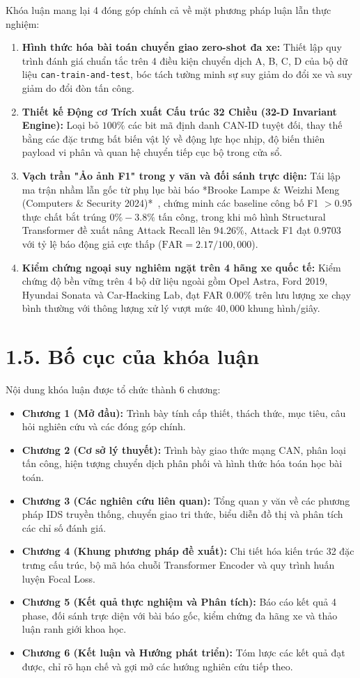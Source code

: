 \documentclass[12pt, a4paper, reqno, oneside]{book}
\newcommand \sect[1]{%
  \section*{#1}%
  \phantomsection%
  \addcontentsline{toc}{section}{#1}}
\begin{document}
Khóa luận mang lại 4 đóng góp chính cả về mặt phương pháp luận lẫn thực nghiệm:
\begin{enumerate}
    \item \textbf{Hình thức hóa bài toán chuyển giao zero-shot đa xe:} Thiết lập quy trình đánh giá chuẩn tắc trên 4 điều kiện chuyển dịch A, B, C, D của bộ dữ liệu \texttt{can-train-and-test}, bóc tách tường minh sự suy giảm do đổi xe và suy giảm do đổi đòn tấn công.
    \item \textbf{Thiết kế Động cơ Trích xuất Cấu trúc 32 Chiều (32-D Invariant Engine):} Loại bỏ $100\%$ các bit mã định danh CAN-ID tuyệt đối, thay thế bằng các đặc trưng bất biến vật lý về động lực học nhịp, độ biến thiên payload vi phân và quan hệ chuyển tiếp cục bộ trong cửa sổ.
    \item \textbf{Vạch trần "Ảo ảnh F1" trong y văn và đối sánh trực diện:} Tái lập ma trận nhầm lẫn gốc từ phụ lục bài báo *Brooke Lampe \& Weizhi Meng (Computers \& Security 2024)*~\cite{lampe2024curated}, chứng minh các baseline công bố F1 $>0.95$ thực chất bắt trúng $0\% - 3.8\%$ tấn công, trong khi mô hình Structural Transformer đề xuất nâng Attack Recall lên $\mathbf{94.26\%}$, Attack F1 đạt $\mathbf{0.9703}$ với tỷ lệ báo động giả cực thấp ($\text{FAR} = 2.17 / 100,000$).
    \item \textbf{Kiểm chứng ngoại suy nghiêm ngặt trên 4 hãng xe quốc tế:} Kiểm chứng độ bền vững trên 4 bộ dữ liệu ngoài gồm Opel Astra, Ford 2019, Hyundai Sonata và Car-Hacking Lab, đạt FAR $0.00\%$ trên lưu lượng xe chạy bình thường với thông lượng xử lý vượt mức $40,000$ khung hình/giây.
\end{enumerate}

\sect{1.5. Bố cục của khóa luận}

Nội dung khóa luận được tổ chức thành 6 chương:
\begin{itemize}
    \item \textbf{Chương 1 (Mở đầu):} Trình bày tính cấp thiết, thách thức, mục tiêu, câu hỏi nghiên cứu và các đóng góp chính.
    \item \textbf{Chương 2 (Cơ sở lý thuyết):} Trình bày giao thức mạng CAN, phân loại tấn công, hiện tượng chuyển dịch phân phối và hình thức hóa toán học bài toán.
    \item \textbf{Chương 3 (Các nghiên cứu liên quan):} Tổng quan y văn về các phương pháp IDS truyền thống, chuyển giao tri thức, biểu diễn đồ thị và phân tích các chỉ số đánh giá.
    \item \textbf{Chương 4 (Khung phương pháp đề xuất):} Chi tiết hóa kiến trúc 32 đặc trưng cấu trúc, bộ mã hóa chuỗi Transformer Encoder và quy trình huấn luyện Focal Loss.
    \item \textbf{Chương 5 (Kết quả thực nghiệm và Phân tích):} Báo cáo kết quả 4 phase, đối sánh trực diện với bài báo gốc, kiểm chứng đa hãng xe và thảo luận ranh giới khoa học.
    \item \textbf{Chương 6 (Kết luận và Hướng phát triển):} Tóm lược các kết quả đạt được, chỉ rõ hạn chế và gợi mở các hướng nghiên cứu tiếp theo.
\end{itemize}
\end{document}
